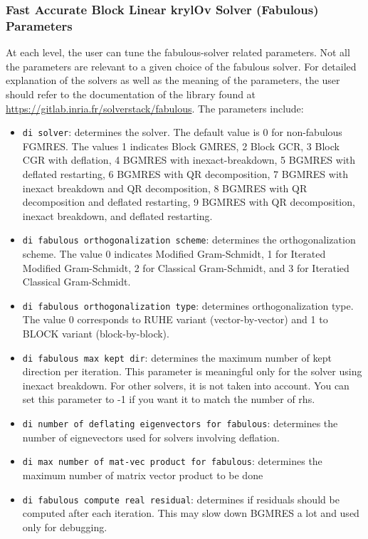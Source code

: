 \documentclass[a4paper,12pt]{scrartcl}
\begin{document}
\subsubsection{Fast Accurate Block Linear krylOv Solver (Fabulous) Parameters}
At each level, the user can tune the fabulous-solver related parameters.  Not all the parameters are relevant to a given choice of the fabulous solver.  For detailed explanation of the solvers as well as the meaning of the parameters, the user should refer to the documentation of the library found at \url{https://gitlab.inria.fr/solverstack/fabulous}.  The parameters include:
\begin{itemize}
\item \texttt{di solver}: determines the solver.  The default value is 0 for non-fabulous FGMRES.  The values 1 indicates Block GMRES, 2 Block GCR, 3 Block CGR with deflation, 4 BGMRES with inexact-breakdown, 5 BGMRES with deflated restarting, 6 BGMRES with QR decomposition, 7 BGMRES with inexact breakdown and QR decomposition, 8 BGMRES with QR decomposition and deflated restarting, 9 BGMRES with QR decomposition, inexact breakdown, and deflated restarting.
\item \texttt{di fabulous orthogonalization scheme}: determines the orthogonalization scheme.  The value 0 indicates Modified Gram-Schmidt, 1 for Iterated Modified Gram-Schmidt, 2 for  Classical Gram-Schmidt, and 3 for Iteratied Classical Gram-Schmidt.
\item \texttt{di fabulous orthogonalization type}: determines orthogonalization type.  The value 0 corresponds to RUHE variant (vector-by-vector) and 1 to BLOCK variant (block-by-block).
\item \texttt{di fabulous max kept dir}:  determines the maximum number of kept direction per iteration.  This parameter is meaningful only for the solver using inexact breakdown.   For other solvers, it is not taken into account. You can set this parameter to -1 if you want it to match the number of rhs.
\item \texttt{di number of deflating eigenvectors for fabulous}: determines the number of eignevectors used for solvers involving deflation.
\item \texttt{di max number of mat-vec product for fabulous}: determines the maximum number of matrix vector product to be done
\item \texttt{di fabulous compute real residual}: determines if residuals should be computed after each iteration.  This may slow down BGMRES a lot and used only for debugging.
\end{itemize}
\end{document}
